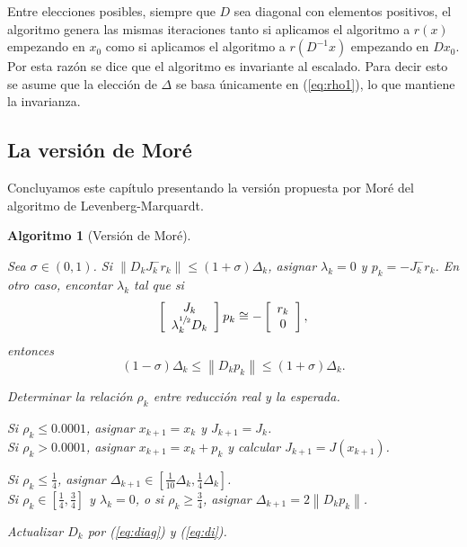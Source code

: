 \documentclass[11pt,a4paper]{book}
\newtheorem{algorithm}[theorem]{Algoritmo}
\theoremstyle{definition}
\theoremstyle{remark}
\newcommand{\norm}[1]{\left\lVert#1\right\rVert}
\begin{document}
Entre elecciones posibles,
siempre que $D$ sea diagonal con elementos positivos, el algoritmo genera las mismas iteraciones tanto si aplicamos
el algoritmo a $r(x)$ empezando en $x_0$ como si aplicamos el algoritmo a $r(D^{-1}x)$ empezando en $Dx_0$.
Por esta razón se dice que el algoritmo es invariante al escalado. Para decir esto se asume que la elección
de $\Delta$ se basa únicamente en (\ref{eq:rho1}), lo que mantiene la invarianza.

\subsection{La versión de Moré}
Concluyamos este capítulo presentando la versión propuesta por Moré del algoritmo de Levenberg-Marquardt.
\begin{algorithm}[Versión de Moré]\label{alg:more}\leavevmode
\begin{steps}
	\item Sea $\sigma \in (0,1)$. Si $\norm{D_kJ_k^{-}r_k} \leq (1+\sigma) \Delta_k$,
	asignar $\lambda_k = 0$ y $p_k = -J_k^{-}r_k$. En otro caso, encontar $\lambda_k$
	tal que si
	\begin{equation}
		\left[
			\begin{array}{c}
				J_k \\
				\lambda_k^{\sfrac{1}{2}}D_k
			\end{array}
		\right]p_k
		\cong
		-\left[
			\begin{array}{c}
				r_k \\
				0
			\end{array}
		\right],
	\end{equation}
	entonces
	\begin{equation}
		(1-\sigma)\Delta_k \leq \norm{D_kp_k} \leq (1+\sigma)\Delta_k.
	\end{equation}
	\item Determinar la relación $\rho_k$ entre reducción real y la esperada.
	\item Si $\rho_k \leq 0.0001$, asignar $x_{k+1} = x_k$ y $J_{k+1} = J_k$. \\
	Si $\rho_k > 0.0001$, asignar $x_{k+1} = x_k + p_k$ y calcular $J_{k+1} = J(x_{k+1})$.
	\item Si $\rho_k \leq \frac{1}{4}$, asignar $\Delta_{k+1} \in \left[
		\frac{1}{10}\Delta_k, \frac{1}{4}\Delta_k \right]$. \\
		Si $\rho_k \in \left[ \frac{1}{4}, \frac{3}{4} \right]$ y $\lambda_k = 0$,
		o si $\rho_k \geq \frac{3}{4}$,
		asignar $\Delta_{k+1} = 2\norm{D_kp_k}$.
	\item Actualizar $D_k$ por (\ref{eq:diag}) y (\ref{eq:di}).
\end{steps}
\end{algorithm}
\end{document}
